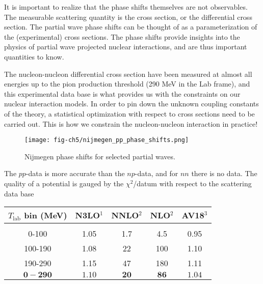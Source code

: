\documentclass[graybox,sectrefs,envcountresetchap,open=right]{svmonodo}
\begin{document}
It is important to realize that the phase shifts themselves are not
observables. The measurable scattering quantity is the cross section,
or the differential cross section. The partial wave phase shifts can
be thought of as a parameterization of the (experimental) cross
sections. The phase shifts provide insights into the physics of
partial wave projected nuclear interactions, and are thus important
quantities to know.

The nucleon-nucleon differential cross section
have been measured at almost all energies up to the pion production
threshold (290 MeV in the Lab frame), and this experimental data base
is what provides us with the constraints on our nuclear interaction
models. In order to pin down the unknown coupling constants of the
theory, a statistical optimization with respect to cross sections need
to be carried out. This is how we constrain the nucleon-nucleon
interaction in practice!






\begin{figure}[t]
  \centerline{\texttt{[image: fig-ch5/nijmegen\_pp\_phase\_shifts.png]}}
  \caption{
  Nijmegen phase shifts for selected partial waves.
  }
\end{figure}


The $pp$-data is more accurate than the $np$-data, and for $nn$ there is no data. The quality of a potential is gauged by the $\chi^2$/datum with respect to the scattering data base





{\small   %

\vspace{4mm}

\begin{tabular}{ccccc}
\hline
\multicolumn{1}{c}{ $T_{\mathrm{lab}}$ bin (MeV) } & \multicolumn{1}{c}{ N3LO$^1$ } & \multicolumn{1}{c}{ NNLO$^2$ } & \multicolumn{1}{c}{ NLO$^2$ } & \multicolumn{1}{c}{ AV18$^3$ } \\
\hline
                             &                 &               &               &                 \\
0-100                        & 1.05            & 1.7           & 4.5           & 0.95            \\
100-190                      & 1.08            & 22            & 100           & 1.10            \\
190-290                      & 1.15            & 47            & 180           & 1.11            \\
$\mathbf{0-290}$             & $\mathbf{1.10}$ & $\mathbf{20}$ & $\mathbf{86}$ & $\mathbf{1.04}$ \\
\hline
\end{tabular}

\vspace{4mm}

}
\end{document}
